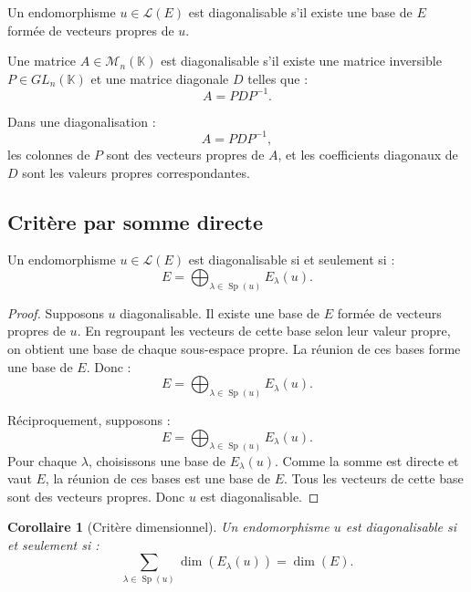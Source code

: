 \documentclass[11pt,a4paper]{article}
\newcommand{\K}{\mathbb K}
\newcommand{\M}{\mathcal M}
\newcommand{\Lcal}{\mathcal L}
\newcommand{\Sp}{\operatorname{Sp}}
\newtheorem{corollaire}[prop]{Corollaire}
\begin{document}
\begin{definitionbox}
Un endomorphisme \(u\in\Lcal(E)\) est diagonalisable s'il existe une base de \(E\) formée de vecteurs propres de \(u\).
\end{definitionbox}

\begin{definitionbox}
Une matrice \(A\in\M_n(\K)\) est diagonalisable s'il existe une matrice inversible \(P\in GL_n(\K)\) et une matrice diagonale \(D\) telles que :
\[
A=PDP^{-1}.
\]
\end{definitionbox}

\begin{retenirbox}
Dans une diagonalisation :
\[
A=PDP^{-1},
\]
les colonnes de \(P\) sont des vecteurs propres de \(A\), et les coefficients diagonaux de \(D\) sont les valeurs propres correspondantes.
\end{retenirbox}

\subsection{Critère par somme directe}

\begin{theorembox}
Un endomorphisme \(u\in\Lcal(E)\) est diagonalisable si et seulement si :
\[
E=\bigoplus_{\lambda\in\Sp(u)}E_\lambda(u).
\]
\end{theorembox}

\begin{proof}
Supposons \(u\) diagonalisable.  
Il existe une base de \(E\) formée de vecteurs propres de \(u\).  
En regroupant les vecteurs de cette base selon leur valeur propre, on obtient une base de chaque sous-espace propre.  
La réunion de ces bases forme une base de \(E\).  
Donc :
\[
E=\bigoplus_{\lambda\in\Sp(u)}E_\lambda(u).
\]

Réciproquement, supposons :
\[
E=\bigoplus_{\lambda\in\Sp(u)}E_\lambda(u).
\]
Pour chaque \(\lambda\), choisissons une base de \(E_\lambda(u)\).  
Comme la somme est directe et vaut \(E\), la réunion de ces bases est une base de \(E\).  
Tous les vecteurs de cette base sont des vecteurs propres.  
Donc \(u\) est diagonalisable.
\end{proof}

\begin{corollaire}[Critère dimensionnel]
Un endomorphisme \(u\) est diagonalisable si et seulement si :
\[
\sum_{\lambda\in\Sp(u)}\dim(E_\lambda(u))=\dim(E).
\]
\end{corollaire}
\end{document}
